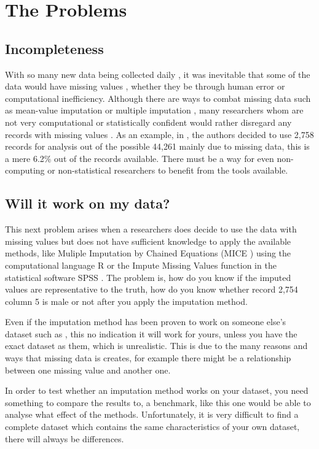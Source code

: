 \documentclass{IEEEconf}
\begin{document}
	\section{The Problems} %
	\label{sec:the_problem}
		\subsection{Incompleteness} %
		\label{sub:incompleteness}
			With so many new data being collected daily \cite{bigData}, it was inevitable that some of the data would have missing values \cite{missing1}, whether they be through human error or computational inefficiency. Although there are ways to combat missing data such as mean-value imputation or multiple imputation \cite{missing1,missing2,missing3}, many researchers whom are not very computational or statistically confident would rather disregard any records with missing values \cite{epi1,ep2,ep3,ep4,ep5}. As an example, in \cite{epi1}, the authors decided to use 2,758 records for analysis out of the possible 44,261 mainly due to missing data, this is a mere 6.2\% out of the records available. There must be a way for even non-computing or non-statistical researchers to benefit from the tools available. 
		\subsection{Will it work on my data?} %
		\label{sub:will_it_work_on_my_data_}
			This next problem arises when a researchers does decide to use the data with missing values but does not have sufficient knowledge to apply the available methods, like Muliple Imputation by Chained Equations (MICE \cite{mice}) using the computational language R \cite{r} or the Impute Missing Values function in the statistical software SPSS \cite{spss}. The problem is, how do you know if the imputed values are representative to the truth, how do you know whether record 2,754 column 5 is male or not after you apply the imputation method.

			Even if the imputation method has been proven to work on someone else's dataset such as \cite{compare}, this no indication it will work for yours, unless you have the exact dataset as them, which is unrealistic. This is due to the many reasons and ways that missing data is creates, for example there might be a relationship between one missing value and another one. 

			In order to test whether an imputation method works on your dataset, you need something to compare the results to, a benchmark, like this one would be able to analyse what effect of the methods. Unfortunately, it is very difficult to find a complete dataset which contains the same characteristics of your own dataset, there will always be differences. 
\end{document}
